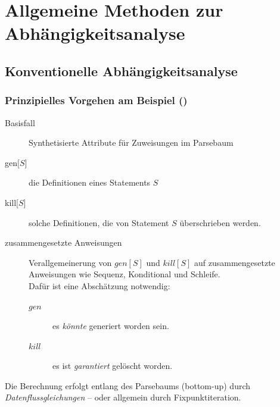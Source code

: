 
\section{Allgemeine Methoden zur Abhängigkeitsanalyse}
\subsection{Konventionelle Abhängigkeitsanalyse} %
\label{sec:konventionelle_abhaengigkeitsanalyse}

\subsubsection{Prinzipielles Vorgehen am Beispiel ()}
\label{ssub:prinzipielles_vorgehen_am_beispiel}

\begin{description}
\item[Basisfall] Synthetisierte Attribute für Zuweisungen im Parsebaum
\item[gen$\lbrack S \rbrack$] die Definitionen eines Statements $S$
\item[kill$\lbrack S \rbrack$] solche Definitionen, die von Statement $S$ überschrieben werden.
\item[zusammengesetzte Anweisungen] Verallgemeinerung von $gen[S]$ und $kill[S]$ auf zusammengesetzte Anweisungen wie Sequenz, Konditional und Schleife.\\
  Dafür ist eine Abschätzung notwendig:
  \begin{description}
    \item[$gen$] es \emph{könnte} generiert worden sein.
    \item[$kill$] es ist \emph{garantiert} gelöscht worden.
  \end{description}
\end{description}

Die Berechnung erfolgt entlang des Parsebaums (bottom-up) durch \emph{Datenflussgleichungen} -- oder allgemein durch Fixpunktiteration.

